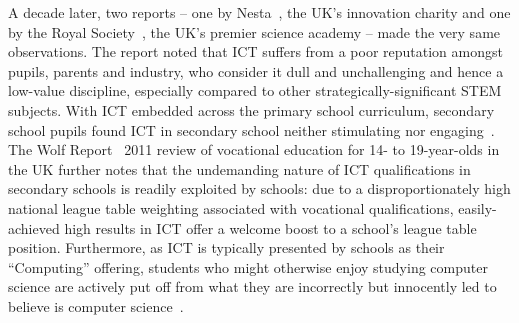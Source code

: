 \documentclass{llncs}
\begin{document}
A decade later, two reports -- one by Nesta~\cite{nextgen-report}, the
UK's innovation charity and one by the Royal
Society~\cite{RoyalSoc:2012}, the UK's premier science academy -- made
the very same observations.  The report noted that ICT suffers from a
poor reputation amongst pupils, parents and industry, who consider it
dull and unchallenging and hence a low-value discipline, especially
compared to other strategically-significant STEM subjects. With ICT
embedded across the primary school curriculum, secondary school pupils
found ICT in secondary school neither stimulating nor
engaging~\cite{sentance-et-al-wipsce2012}. The Wolf
Report~\cite{Wolf:2011} 2011 review of vocational education for 14- to
19-year-olds in the UK further notes that the undemanding nature of
ICT qualifications in secondary schools is readily exploited by
schools: due to a disproportionately high national league table
weighting associated with vocational qualifications, easily-achieved
high results in ICT offer a welcome boost to a school's league table
position. Furthermore, as ICT is typically presented by schools as
their ``Computing'' offering, students who might otherwise enjoy
studying computer science are actively put off from what they are
incorrectly but innocently led to believe is computer
science~\cite{crick+sentance:2011,brown-et-al-sigcse2012}.

\end{document}
